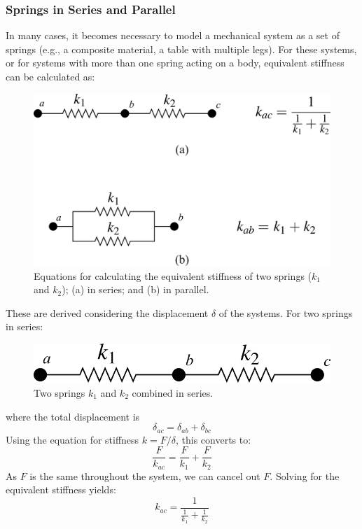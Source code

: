 \documentclass[12pt,letter]{article}
\begin{document}
		\subsubsection{Springs in Series and Parallel}
			
			In many cases, it becomes necessary to model a mechanical system as a set of springs (e.g., a composite material, a table with multiple legs).  For these systems, or for systems with more than one spring acting on a body, equivalent stiffness can be calculated as:
			\begin{figure}[H]
				\centering
				\includegraphics[]{../figures/equivalent_stiffness.png}
				\caption{Equations for calculating the equivalent stiffness of two springs ($k_1$ and $k_2$); (a) in series; and (b) in parallel.}
			\end{figure}	
			These are derived considering the displacement $\delta$ of the systems. For two springs in series:
			\begin{figure}[H]
				\centering
				\includegraphics[]{../figures/equivalent_stiffness_series.png}
				\caption{Two springs $k_1$ and $k_2$ combined in series.}
			\end{figure}			
			\noindent where the total displacement is 
			\begin{equation}
				\delta_{ac} = \delta_{ab} + \delta_{bc}
			\end{equation}
			Using the equation for stiffness $k=F/\delta$, this converts to:
			\begin{equation}
				\frac{F}{k_{ac}} = \frac{F}{k_{1}} + \frac{F}{k_{2}}
			\end{equation}
			As $F$ is the same throughout the system, we can cancel out $F$. Solving for the equivalent stiffness yields:
			\begin{equation}
				k_{ac} = \frac{1}{\frac{1}{k_1}+\frac{1}{k_2}}
			\end{equation}
		
\end{document}
